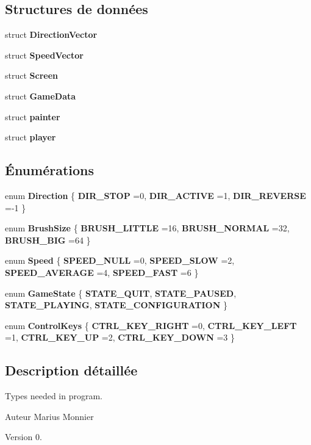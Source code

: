 \subsection*{Structures de données}
\begin{DoxyCompactItemize}
\item 
struct \textbf{ Direction\+Vector}
\item 
struct \textbf{ Speed\+Vector}
\item 
struct \textbf{ Screen}
\item 
struct \textbf{ Game\+Data}
\item 
struct \textbf{ painter}
\item 
struct \textbf{ player}
\end{DoxyCompactItemize}
\subsection*{Énumérations}
\begin{DoxyCompactItemize}
\item 
enum \textbf{ Direction} \{ \textbf{ D\+I\+R\+\_\+\+S\+T\+OP} =0, 
\textbf{ D\+I\+R\+\_\+\+A\+C\+T\+I\+VE} =1, 
\textbf{ D\+I\+R\+\_\+\+R\+E\+V\+E\+R\+SE} =-\/1
 \}
\item 
enum \textbf{ Brush\+Size} \{ \textbf{ B\+R\+U\+S\+H\+\_\+\+L\+I\+T\+T\+LE} =16, 
\textbf{ B\+R\+U\+S\+H\+\_\+\+N\+O\+R\+M\+AL} =32, 
\textbf{ B\+R\+U\+S\+H\+\_\+\+B\+IG} =64
 \}
\item 
enum \textbf{ Speed} \{ \textbf{ S\+P\+E\+E\+D\+\_\+\+N\+U\+LL} =0, 
\textbf{ S\+P\+E\+E\+D\+\_\+\+S\+L\+OW} =2, 
\textbf{ S\+P\+E\+E\+D\+\_\+\+A\+V\+E\+R\+A\+GE} =4, 
\textbf{ S\+P\+E\+E\+D\+\_\+\+F\+A\+ST} =6
 \}
\item 
enum \textbf{ Game\+State} \{ \textbf{ S\+T\+A\+T\+E\+\_\+\+Q\+U\+IT}, 
\textbf{ S\+T\+A\+T\+E\+\_\+\+P\+A\+U\+S\+ED}, 
\textbf{ S\+T\+A\+T\+E\+\_\+\+P\+L\+A\+Y\+I\+NG}, 
\textbf{ S\+T\+A\+T\+E\+\_\+\+C\+O\+N\+F\+I\+G\+U\+R\+A\+T\+I\+ON}
 \}
\item 
enum \textbf{ Control\+Keys} \{ \textbf{ C\+T\+R\+L\+\_\+\+K\+E\+Y\+\_\+\+R\+I\+G\+HT} =0, 
\textbf{ C\+T\+R\+L\+\_\+\+K\+E\+Y\+\_\+\+L\+E\+FT} =1, 
\textbf{ C\+T\+R\+L\+\_\+\+K\+E\+Y\+\_\+\+UP} =2, 
\textbf{ C\+T\+R\+L\+\_\+\+K\+E\+Y\+\_\+\+D\+O\+WN} =3
 \}
\end{DoxyCompactItemize}


\subsection{Description détaillée}
Types needed in program. 

\begin{DoxyAuthor}{Auteur}
Marius Monnier 
\end{DoxyAuthor}
\begin{DoxyVersion}{Version}
0. 
\end{DoxyVersion}
